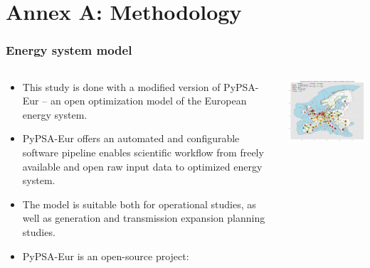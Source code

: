 
\section{Annex A: Methodology}


\begin{frame}
  \label{methodology} %
  \frametitle{Energy system model}

  \begin{columns}[T]
  \begin{column}{7cm}
  {\footnotesize
  \begin{itemize}
  \item This study is done with a modified version of \alert{PyPSA-Eur} -- an open optimization model of the European energy system.
  \item PyPSA-Eur offers an automated and configurable software pipeline enables scientific workflow from freely available and open raw input data to optimized energy system. 
  \item The model is suitable both for operational studies, as well as generation and transmission expansion planning studies. 
  \item  PyPSA-Eur is an open-source project: \\
  \faGithub~ \\
  \faBook~ \\
  \faLink~ 
  \end{itemize}
  }
  \end{column}

  \begin{column}{9cm}
    \centering
    \vspace{0.1cm}
    \includegraphics[width=8cm]{images/elec_s_100.png}
  \end{column}
  \end{columns}

\end{frame}



